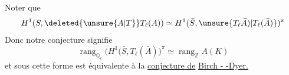 Noter que %
\[
H^1(S,\deleted{\unsure{A|T}}T_\ell(A))\simeq H^1(\bar S,\unsure{T_\ell\bar A)|T_\ell(\bar A)})^\pi %
\]
Donc notre conjecture signifie  %
\[
\operatorname{rang}_{\mathbb{Q}_\ell}\bigl(H^1(\bar S,T_\ell(\bar A)\bigr)^\pi
 \simeq \operatorname{rang}_{\mathbb{Z}} A(K) %
\]
et sous cette forme est  %
équivalente à la \uline{conjecture de} %
 \uline{Birch - -Dyer.} %
